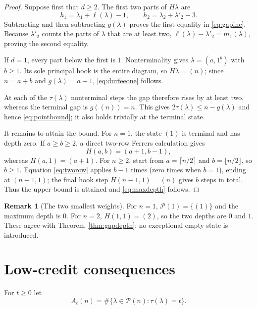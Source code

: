 \documentclass[10pt]{amsart}
\theoremstyle{definition}
\newtheorem{remark}[theorem]{Remark}
\newcommand{\Par}{\mathcal P}
\newcommand{\ellp}{\ell}
\begin{document}
\begin{proof}
Suppose first that $d\geq2$.  The first two parts of $H\lambda$ are
\[
 h_1=\lambda_1+\ellp(\lambda)-1,
 \qquad
 h_2=\lambda_2+\lambda'_2-3.
\]
Subtracting and then subtracting $g(\lambda)$ proves the first equality in
\eqref{eq:gapinc}.  Because $\lambda'_2$ counts the parts of $\lambda$ that
are at least two, $\ellp(\lambda)-\lambda'_2=m_1(\lambda)$, proving the
second equality.

If $d=1$, every part below the first is $1$.  Nonterminality gives
$\lambda=(a,1^b)$ with $b\geq1$.  Its sole principal hook is the entire
diagram, so $H\lambda=(n)$; since $n=a+b$ and $g(\lambda)=a-1$,
\eqref{eq:durfeeone} follows.

At each of the $\tau(\lambda)$ nonterminal steps the gap therefore rises by
at least two, whereas the terminal gap is $g((n))=n$.  This gives
$2\tau(\lambda)\leq n-g(\lambda)$ and hence \eqref{eq:pointbound}; it also
holds trivially at the terminal state.

It remains to attain the bound.  For $n=1$, the state $(1)$ is terminal and
has depth zero.  If $a\geq b\geq2$, a direct two-row Ferrers
calculation gives
\begin{equation}
 \label{eq:tworow}
 H(a,b)=(a+1,b-1),
\end{equation}
whereas $H(a,1)=(a+1)$.  For $n\geq2$, start from
$a=\lceil n/2\rceil$ and $b=\lfloor n/2\rfloor$, so $b\geq1$.  Equation
\eqref{eq:tworow} applies $b-1$ times (zero times when $b=1$), ending at
$(n-1,1)$; the final hook step $H(n-1,1)=(n)$ gives $b$ steps in total.
Thus the upper bound is attained and \eqref{eq:maxdepth} follows.
\end{proof}

\begin{remark}[The two smallest weights]
For $n=1$, $\Par(1)=\{(1)\}$ and the maximum depth is $0$.  For $n=2$,
$H(1,1)=(2)$, so the two depths are $0$ and $1$.  These agree with
Theorem~\ref{thm:gapdepth}; no exceptional empty state is introduced.
\end{remark}

\section{Low-credit consequences}

For $t\geq0$ let
\[
 A_t(n)=\#\{\lambda\in\Par(n):\tau(\lambda)=t\}.
\]
\end{document}
